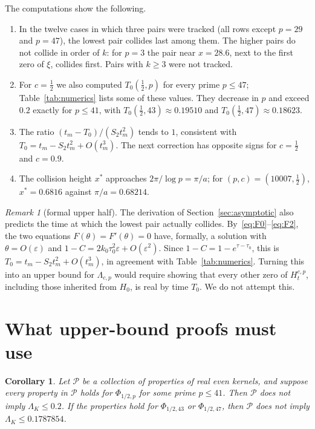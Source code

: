 \documentclass[11pt]{article}
\numberwithin{equation}{section}
\newtheorem{corollary}[theorem]{Corollary}
\theoremstyle{definition}
\theoremstyle{remark}
\newtheorem{remark}[theorem]{Remark}
\begin{document}
The computations show the following.
\begin{enumerate}[label=(\arabic*)]
\item In the twelve cases in which three pairs were tracked (all rows
except $p=29$ and $p=47$), the lowest pair collides last among them. The higher pairs do not collide in order of $k$: for
$p=3$ the pair near $x=28.6$, next to the first zero of $\xi$, collides
first. Pairs with $k\ge3$ were not tracked.
\item For $c=\tfrac12$ we also computed $T_0(\tfrac12,p)$ for every prime
$p\le47$; Table~\ref{tab:numerics} lists some of these values. They
decrease in $p$ and exceed $0.2$ exactly for $p\le41$, with
$T_0(\tfrac12,43)\approx0.19510$ and $T_0(\tfrac12,47)\approx0.18623$.
\item The ratio $(t_m-T_0)/(S_2t_m^2)$ tends to $1$, consistent with
$T_0=t_m-S_2t_m^2+O(t_m^3)$. The next correction has opposite signs for
$c=\tfrac12$ and $c=0.9$.
\item The collision height $x^*$ approaches $2\pi/\log p=\pi/a$; for
$(p,c)=(10007,\tfrac12)$, $x^*=0.6816$ against $\pi/a=0.68214$.
\end{enumerate}

\begin{remark}[formal upper half]
The derivation of Section~\ref{sec:asymptotic} also predicts the time at which
the lowest pair actually collides. By~\eqref{eq:F0}--\eqref{eq:F2}, the two
equations $F(\theta)=F'(\theta)=0$ have, formally, a solution with
$\theta=O(\varepsilon)$ and $1-C=2k_0\tau_0^2\varepsilon+O(\varepsilon^2)$.
Since $1-C=1-e^{\tau-\tau_0}$, this is
$T_0=t_m-S_2t_m^2+O(t_m^3)$, in agreement with Table~\ref{tab:numerics}.
Turning this into an upper bound for $\Lambda_{c,p}$ would require showing
that every other zero of $H^{c,p}_t$, including those inherited from $H_0$,
is real by time $T_0$. We do not attempt this.
\end{remark}

\section{What upper-bound proofs must use}\label{sec:screening}

\begin{corollary}\label{cor:screen}
Let $\mathcal P$ be a collection of properties of real even kernels, and
suppose every property in $\mathcal P$ holds for $\Phi_{1/2,p}$ for some prime
$p\le41$. Then $\mathcal P$ does not imply $\Lambda_K\le0.2$. If the
properties hold for $\Phi_{1/2,43}$ or $\Phi_{1/2,47}$, then $\mathcal P$
does not imply $\Lambda_K\le0.1787854$.
\end{corollary}
\end{document}
